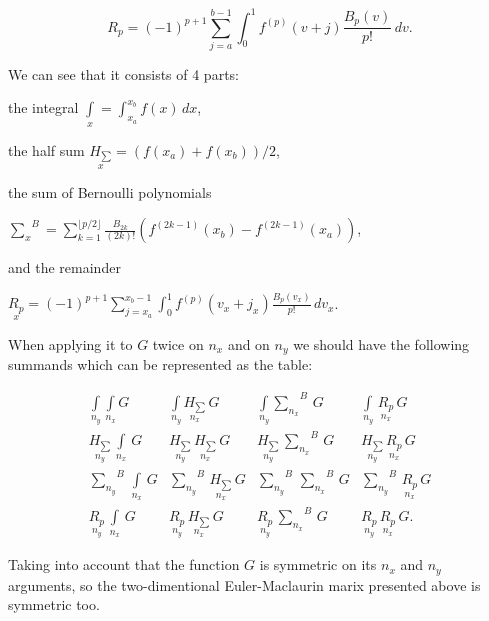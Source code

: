 \documentclass[twoside, 10pt, ptm]{article}
\begin{document}
\begin{multicols}{2}
\begin{equation} \label{eq:10}
{\displaystyle R_{p}=(-1)^{p+1}\sum_{j=a}^{b-1} \int _{0}^{1}f^{(p)}(v+j){\frac {B_{p}(v)}{p!}}\,dv}.
\end{equation}

We can see that it consists of 4 parts:

\noindent
the integral \(\int\limits_{x}^{}=\int _{x_a}^{x_b}f(x)\,dx\),

\noindent
the half sum \(\underset{x}{H_{\sum}}={\left( {f(x_a)+f(x_b)}\right)/{2}}\),

\noindent
the sum of Bernoulli polynomials

\({\sum\limits_{x}^{}}^{B}=\sum _{k=1}^{\lfloor p/2\rfloor }{\frac {B_{2k}}{(2k)!}}\left(f^{(2k-1)}(x_b)-f^{(2k-1)}(x_a)\right)\),

\noindent
and the remainder

\(\underset{x}{R_{p}}=(-1)^{p+1}\sum_{j=x_a}^{x_b-1} \int _{0}^{1}f^{(p)}(v_x+j_x){\frac {B_{p}(v_x)}{p!}}\,dv_x\).

When applying it to \(G\) twice on \(n_x\) and on \(n_y\) we should have
the following summands which can be represented as the table:

    \begin{equation} \label{eq:11}
\begin{array}{cccc}
 \int\limits_{n_y}^{} \int\limits_{n_x}^{} G  &  \int\limits_{n_y}^{} \underset{n_x}{H_{\sum}}\,G  &  \int\limits_{n_y}^{}{\sum\limits_{n_x}^{}}^{B}\,G  &  \int\limits_{n_y}^{}\,\underset{n_x}{R_{p}}\,G  \\
 \underset{n_y}{H_{\sum}}\,\int\limits_{n_x}^{}\,G &  \underset{n_y}{H_{\sum}}\,\underset{n_x}{H_{\sum}}\,G &  \underset{n_y}{H_{\sum}}\,{\sum\limits_{n_x}^{}}^{B}\,G &  \underset{n_y}{H_{\sum}}\,\underset{n_x}{R_{p}}\,G \\
 {\sum\limits_{n_y}^{}}^{B}\,\int\limits_{n_x}^{}\,G  &  {\sum\limits_{n_y}^{}}^{B}\,\underset{n_x}{H_{\sum}}\,G  &  {\sum\limits_{n_y}^{}}^{B}\,{\sum\limits_{n_x}^{}}^{B}\,G  &  {\sum\limits_{n_y}^{}}^{B}\,\underset{n_x}{R_{p}}\,G  \\
 \underset{n_y}{R_{p}}\,\int\limits_{n_x}^{}\,G   &  \underset{n_y}{R_{p}}\,\underset{n_x}{H_{\sum}}\,G   &  \underset{n_y}{R_{p}}\,{\sum\limits_{n_x}^{}}^{B}\,G   &  \underset{n_y}{R_{p}}\,\underset{n_x}{R_{p}}\,G.
\end{array}\end{equation}

    Taking into account that the function \(G\) is symmetric on
its \(n_x\) and \(n_y\) arguments, so the two-dimentional
Euler-Maclaurin marix presented above is symmetric too.


\end{multicols}
\end{document}
